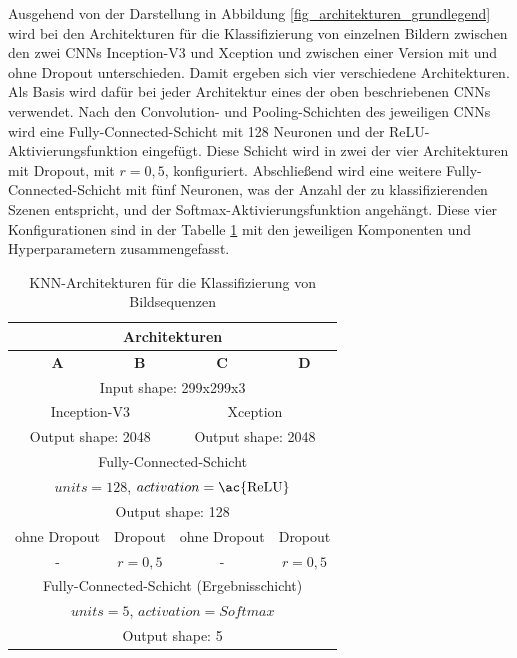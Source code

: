 Ausgehend von der Darstellung in Abbildung \ref{fig_architekturen_grundlegend} wird bei den Architekturen für die Klassifizierung von einzelnen Bildern zwischen den zwei \acp{CNN} Inception-V3 \cite{szegedy2016inception} und Xception \cite{chollet2017xception} und zwischen einer Version mit und ohne Dropout \cite{srivastava2014dropout} unterschieden. Damit ergeben sich vier verschiedene Architekturen. Als Basis wird dafür bei jeder Architektur eines der oben beschriebenen \acp{CNN} verwendet. Nach den Convolution- und Pooling-Schichten des jeweiligen \acp{CNN} wird eine Fully-Connected-Schicht mit 128 Neuronen und der \ac{ReLU}-Aktivierungsfunktion eingefügt. Diese Schicht wird in zwei der vier Architekturen mit Dropout, mit $r=0,5$, konfiguriert. Abschließend wird eine weitere Fully-Connected-Schicht mit fünf Neuronen, was der Anzahl der zu klassifizierenden Szenen entspricht, und der Softmax-Aktivierungsfunktion angehängt. Diese vier Konfigurationen sind in der Tabelle \ref{tab_architekturen_bild} mit den jeweiligen Komponenten und Hyperparametern zusammengefasst.

\begin{table}[h]
\centering
\def\arraystretch{1.4}
\begin{tabular}{|c|c|c|c|}
\hline
\multicolumn{4}{|c|}{\textbf{Architekturen}} \\
\hline
\textbf{A} & \textbf{B} & \textbf{C} & \textbf{D} \\
\hline
\hline
\multicolumn{4}{|c|}{Input shape: 299x299x3} \\
\hline
\multicolumn{2}{|c|}{Inception-V3} & \multicolumn{2}{|c|}{Xception} \\
\multicolumn{2}{|c|}{Output shape: 2048} & \multicolumn{2}{|c|}{Output shape: 2048} \\
\hline
\multicolumn{4}{|c|}{Fully-Connected-Schicht} \\
\multicolumn{4}{|c|}{$units=128$, $activation=\text{\ac{ReLU}}$} \\
\multicolumn{4}{|c|}{Output shape: 128} \\
\hline
ohne Dropout & Dropout & ohne Dropout & Dropout \\
- & $r=0,5$ & - & $r=0,5$ \\
\hline
\multicolumn{4}{|c|}{Fully-Connected-Schicht (Ergebnisschicht)} \\
\multicolumn{4}{|c|}{$units=5$, $activation=Softmax$} \\
\multicolumn{4}{|c|}{Output shape: 5} \\
\hline
\end{tabular}
\caption{\ac{KNN}-Architekturen für die Klassifizierung von Bildsequenzen}
\label{tab_architekturen_bild}
\end{table}

